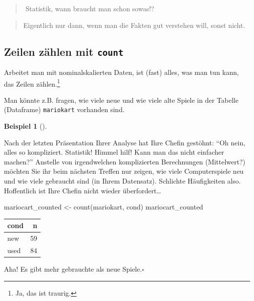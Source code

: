 \documentclass[
  a4paper,
  DIV=11]{scrreprt}
\newenvironment{Shaded}{\begin{snugshade}}{\end{snugshade}}
\newcommand{\FunctionTok}[1]{\textcolor[rgb]{0.28,0.35,0.67}{#1}}
\newcommand{\NormalTok}[1]{\textcolor[rgb]{0.00,0.23,0.31}{#1}}
\newcommand{\OtherTok}[1]{\textcolor[rgb]{0.00,0.23,0.31}{#1}}
\theoremstyle{definition}
\theoremstyle{definition}
\newtheorem{example}{Beispiel}[chapter]
\theoremstyle{definition}
\theoremstyle{remark}
\begin{document}
\begin{quote}
{}️ Statistik, wann braucht man schon sowas!?
\end{quote}

\begin{quote}
{} Eigentlich nur dann, wenn man die Fakten gut verstehen
will, sonst nicht.
\end{quote}

\subsection{\texorpdfstring{Zeilen zählen mit
\texttt{count}}{Zeilen zählen mit count}}\label{zeilen-zuxe4hlen-mit-count}

Arbeitet man mit nominalskalierten Daten, ist (fast) alles, was man tun
kann, das Zeilen zählen.\footnote{Ja, das ist traurig.}

Man könnte z.B. fragen, wie viele neue und wie viele alte Spiele in der
Tabelle (Dataframe) \texttt{mariokart} vorhanden sind.

\begin{example}[]\protect\hypertarget{exm-count}{}\label{exm-count}

Nach der letzten Präsentation Ihrer Analyse hat Ihre Chefin gestöhnt:
``Oh nein, alles so kompliziert. Statistik! Himmel hilf! Kann man das
nicht einfacher machen?'' Anstelle von irgendwelchen komplizierten
Berechnungen (Mittelwert?) möchten Sie ihr beim nächsten Treffen nur
zeigen, wie viele Computerspiele neu und wie viele gebraucht sind (in
Ihrem Datensatz). Schlichte Häufigkeiten also. Hoffentlich ist Ihre
Chefin nicht wieder überfordert\ldots{}

\begin{Shaded}
\begin{Highlighting}[]
\NormalTok{mariocart\_counted }\OtherTok{\textless{}{-}} \FunctionTok{count}\NormalTok{(mariokart, cond)}
\NormalTok{mariocart\_counted}
\end{Highlighting}
\end{Shaded}

\begin{longtable}[]{@{}lr@{}}
\toprule\noalign{}
cond & n \\
\midrule\noalign{}
\endhead
\bottomrule\noalign{}
\endlastfoot
new & 59 \\
used & 84 \\
\end{longtable}

Aha! Es gibt mehr gebrauchte als neue Spiele.\(\square\)

\end{example}
\end{document}
